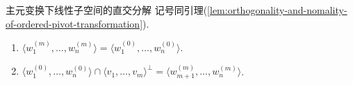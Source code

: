 \begin{theorem}{主元变换下线性子空间的直交分解}{}
	记号同引理(\ref{lem:orthogonality-and-nomality-of-ordered-pivot-transformation}).
	\begin{enumerate}
		\item $\langle w_{1}^{\left(m\right)},\ldots,w_{n}^{\left(m\right)}\rangle=\langle w_{1}^{\left(0\right)},\ldots,w_{n}^{\left(0\right)}\rangle$.
		\item $\langle w_{1}^{\left(0\right)},\ldots,w_{n}^{\left(0\right)}\rangle\cap\langle v_{1},\ldots,v_{m}\rangle^{\perp}=\langle w_{m+1}^{\left(m\right)},\ldots,w_{n}^{\left(m\right)}\rangle$.
	\end{enumerate}
\end{theorem}






































